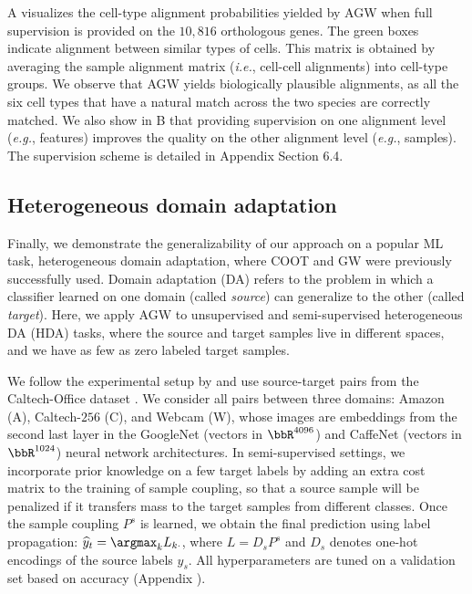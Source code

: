 
A visualizes the cell-type alignment probabilities yielded by AGW
when full supervision is provided on the $10,816$ orthologous genes.
The green boxes indicate alignment between similar types of cells.
This matrix is obtained by averaging the sample alignment matrix
(\textit{i.e.}, cell-cell alignments) into cell-type groups. We observe that
AGW yields biologically plausible alignments, as all the six cell types that
have a natural match across the two species are correctly matched.
We also show in B that providing supervision on one alignment level (\textit{e.g.},
features) improves the quality on the other alignment level (\textit{e.g.}, samples).
The supervision scheme is detailed in Appendix Section 6.4.


\subsection{Heterogeneous domain adaptation}
Finally, we demonstrate the generalizability of our approach on a popular ML task,
heterogeneous domain adaptation, where COOT and GW were previously successfully used.
Domain adaptation (DA) refers to the problem in which a classifier learned on one domain
(called \textit{source}) can generalize to the other (called \textit{target}). Here,
we apply AGW to unsupervised and semi-supervised heterogeneous DA (HDA) tasks,
where the source and target samples live in different spaces, and we have as few as
zero labeled target samples.

We follow the experimental setup by \citep{Redko20} and use source-target pairs
from the Caltech-Office dataset \citep{Saenko10}. We consider all pairs between three domains:
Amazon (A), Caltech-$256$ (C), and Webcam (W), whose images are embeddings from
the second last layer in the GoogleNet \citep{Szegedy15} (vectors in $\bbR^{4096}$)
and CaffeNet \citep{Jia14} (vectors in $\bbR^{1024}$) neural network architectures.
In semi-supervised settings, we incorporate prior knowledge on a few target labels
by adding an extra cost matrix to the training of sample coupling, so that
a source sample will be penalized if it transfers mass to the target samples from different classes.
Once the sample coupling $P^s$ is learned, we obtain the final prediction using label propagation:
$\widehat{y}_t = \argmax_k L_{k\cdot}$,
where $L = D_s P^s$ and $D_s$ denotes one-hot encodings of the source labels $y_s$.
All hyperparameters are tuned on a validation set based on accuracy (Appendix ).


